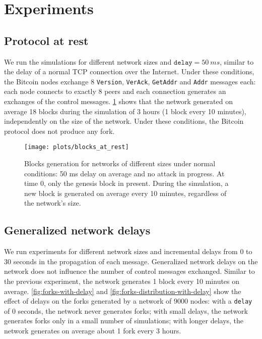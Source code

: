 \section{Experiments}

\subsection{Protocol at rest}
We run the simulations for different network sizes and $\texttt{delay} = 50 ~ms$, similar to the delay of a normal TCP connection over the Internet.
Under these conditions, the Bitcoin nodes exchange $8$ \texttt{Version}, \texttt{VerAck}, \texttt{GetAddr} and \texttt{Addr} messages each:
each node connects to exactly \num{8} peers and each connection generates an exchanges of the control messages.
\cref{fig:blocks-at-rest} shows that the network generated on average \num{18} blocks during the simulation of \num{3} hours (\num{1} block every \num{10} minutes), independently on the size of the network.
Under these conditions, the Bitcoin protocol does not produce any fork.

\begin{figure}[ht]
	\centering
	\advance \leftskip \myextraleftmargin
	\texttt{[image: plots/blocks\_at\_rest]}
	\caption[Blocks generation for networks of different sizes]{
		Blocks generation for networks of different sizes under normal conditions:
		\num{50} ms delay on average and no attack in progress.
		At time \num{0}, only the genesis block in present.
		During the simulation, a new block is generated on average every \num{10} minutes, regardless of the network's size.
	}
	\label{fig:blocks-at-rest}
\end{figure}

\subsection{Generalized network delays}
We run experiments for different network sizes and incremental delays from \num{0} to \num{30} seconds in the propagation of each message.
Generalized network delays on the network does not influence the number of control messages exchanged.
Similar to the previous experiment, the network generates \num{1} block every \num{10} minutes on average.
\cref{fig:forks-with-delay} and \cref{fig:forks-distribution-with-delay} show the effect of delays on the forks generated by a network of \num{9000} nodes:
with a \texttt{delay} of \num{0} seconds, the network never generates forks;
with small delays, the network generates forks only in a small number of simulations;
with longer delays, the network generates on average about \num{1} fork every \num{3} hours.

